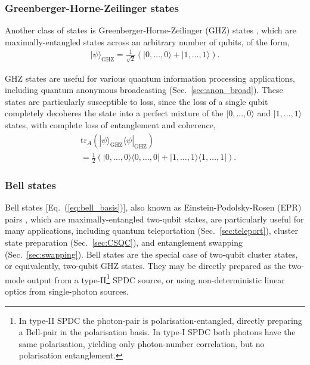 \documentclass[aps,rmp,twocolumn,amsmath,amssymb,nofootinbib,superscriptaddress,longbibliography,floatfix,table-of-contents,eqsecnum]{revtex4-1}
\newcommand{\bra}[1]{\langle#1|}
\newcommand{\ket}[1]{|#1\rangle}
\begin{document}
%
%

\subsubsection{Greenberger-Horne-Zeilinger states} 

Another class of states is Greenberger-Horne-Zeilinger (GHZ) states \cite{bib:GHZ89}, which are maximally-entangled states across an arbitrary number of qubits, of the form,
\begin{align}
\ket\psi_\text{GHZ} = \frac{1}{\sqrt{2}}(\ket{0,\dots,0} + \ket{1,\dots,1}).
\end{align}

GHZ states are useful for various quantum information processing applications, including quantum anonymous broadcasting (Sec.~\ref{sec:anon_broad}). These states are particularly susceptible to loss, since the loss of a single qubit completely decoheres the state into a perfect mixture of the \mbox{$\ket{0,\dots,0}$} and \mbox{$\ket{1,\dots,1}$} states, with complete loss of entanglement and coherence,
\begin{align}
&\text{tr}_A(\ket\psi_\text{GHZ}\bra\psi_\text{GHZ})\nonumber \\
&= \frac{1}{2}(\ket{0,\dots,0}\bra{0,\dots,0}+\ket{1,\dots,1}\bra{1,\dots,1}).
\end{align}

%
%

\subsubsection{Bell states} \label{sec:bell_state_res} 

Bell states [Eq.~(\ref{eq:bell_basis})], also known as Einstein-Podolsky-Rosen (EPR) pairs \cite{bib:EPR35}, which are maximally-entangled two-qubit states, are particularly useful for many applications, including quantum teleportation (Sec.~\ref{sec:teleport}), cluster state preparation (Sec.~\ref{sec:CSQC}), and entanglement swapping (Sec.~\ref{sec:swapping}). Bell states are the special case of two-qubit cluster states, or equivalently, two-qubit GHZ states. They may be directly prepared as the two-mode output from a type-II\footnote{In type-II SPDC the photon-pair is polarisation-entangled, directly preparing a Bell-pair in the polarisation basis. In type-I SPDC both photons have the same polarisation, yielding only photon-number correlation, but no polarisation entanglement.} SPDC source, or using non-deterministic linear optics from single-photon sources.
\end{document}
